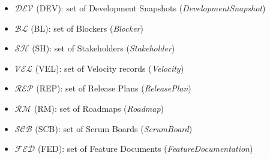 \documentclass[11pt,a4paper]{article}
\begin{document}
\begin{itemize}[leftmargin=2em]
  \item $\mathcal{DEV}$ (DEV): set of Development Snapshots (\textit{DevelopmentSnapshot})
  \item $\mathcal{BL}$ (BL): set of Blockers (\textit{Blocker})
  \item $\mathcal{SH}$ (SH): set of Stakeholders (\textit{Stakeholder})
  \item $\mathcal{VEL}$ (VEL): set of Velocity records (\textit{Velocity})
  \item $\mathcal{REP}$ (REP): set of Release Plans (\textit{ReleasePlan})
  \item $\mathcal{RM}$ (RM): set of Roadmaps (\textit{Roadmap})
  \item $\mathcal{SCB}$ (SCB): set of Scrum Boards (\textit{ScrumBoard})
  \item $\mathcal{FED}$ (FED): set of Feature Documents (\textit{FeatureDocumentation})
\end{itemize}
\end{document}
